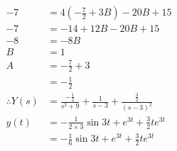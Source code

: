 \documentclass{article}
\begin{document}
\begin{align*}
    -7                                      & = 4(-\frac{7}{2}+3B)-20B+15                                    \\
    -7                                      & = -14+12B-20B+15                                               \\
    -8                                      & = -8B                                                          \\
    B                                       & = 1                                                            \\
    A                                       & = -\frac{7}{2}+3                                               \\
                                            & = -\frac12                                                     \\
    \therefore Y(s)                         & = \frac{-\frac12}{s^2+9}+\frac{1}{s-3}+\frac{\frac32}{(s-3)^2} \\
    y(t)                                    & = -\frac{1}{2\times3}\sin{3t}+e^{3t}+\frac32te^{3t}            \\
                                            & = -\frac{1}{6}\sin{3t}+e^{3t}+\frac32te^{3t}                   \\
\end{align*}
\end{document}
